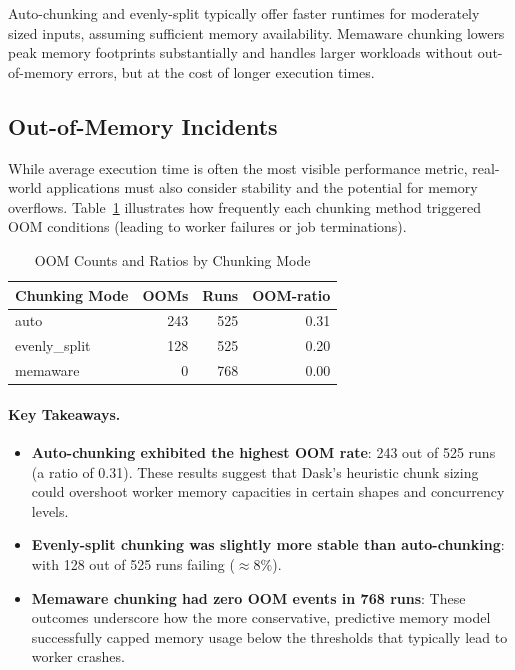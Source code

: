 Auto-chunking and evenly-split typically offer faster runtimes for moderately sized inputs, assuming sufficient memory availability.
Memaware chunking lowers peak memory footprints substantially and handles larger workloads without out-of-memory errors, but at the cost of longer execution times.

\subsection{Out-of-Memory Incidents}
\label{subsec:oom-results}

While average execution time is often the most visible performance metric, real-world applications must also consider stability and the potential for memory overflows.
Table~\ref{tab:oom_stats} illustrates how frequently each chunking method triggered \ac{OOM} conditions (leading to worker failures or job terminations).

\begin{table}[ht]
    \centering
    \caption{\ac{OOM} Counts and Ratios by Chunking Mode}
    \label{tab:oom_stats}
    \begin{tabular}{lrrr}
        \toprule
        \textbf{Chunking Mode} & \textbf{\ac{OOM}s} & \textbf{Runs} & \textbf{\ac{OOM}-ratio} \\
        \midrule
        auto                   & 243                & 525           & 0.31                    \\
        evenly\_split          & 128                & 525           & 0.20                    \\
        memaware               & 0                  & 768           & 0.00                    \\
        \bottomrule
    \end{tabular}
\end{table}

\paragraph{Key Takeaways.}
\begin{itemize}
    \item \textbf{Auto-chunking exhibited the highest \ac{OOM} rate}: 243 out of 525 runs (a ratio of 0.31). These results suggest that Dask's heuristic chunk sizing could overshoot worker memory capacities in certain shapes and concurrency levels.
    \item \textbf{Evenly-split chunking was slightly more stable than auto-chunking}: with 128 out of 525 runs failing (\(\approx 8\%\)).
    \item \textbf{Memaware chunking had zero \ac{OOM} events in 768 runs}: These outcomes underscore how the more conservative, predictive memory model successfully capped memory usage below the thresholds that typically lead to worker crashes.
\end{itemize}

